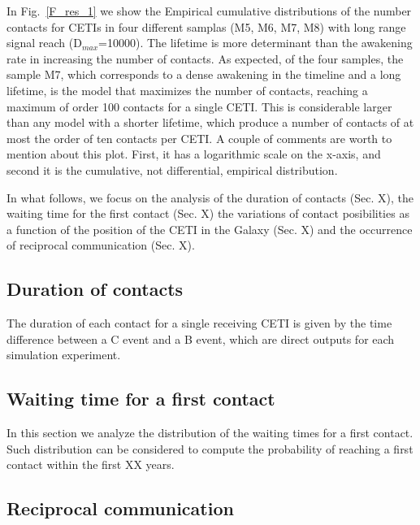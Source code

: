 \documentclass[crop]{CSLB}%
\begin{document}
In Fig.~\ref{F_res_1} we show the Empirical cumulative distributions
of the number contacts for CETIs in four different samplas (M5, M6,
M7, M8) with long range signal reach (D$_{max}$=10000). 
%
The lifetime is more determinant than the awakening rate in increasing
the number of contacts.
%
As expected, of the four samples, the sample M7, which corresponds to
a dense awakening in the timeline and a long lifetime, is the model
that maximizes the number of contacts, reaching a maximum of order 100
contacts for a single CETI.
%
This is considerable larger than any model with a shorter lifetime,
which produce a number of contacts of at most the order of ten
contacts per CETI.
%
A couple of comments are worth to mention about this plot.
%
First, it has a logarithmic scale on the x-axis, and second it is the
cumulative, not differential, empirical distribution.
 



In what follows, we focus on the analysis of the duration of contacts
(Sec. X), the waiting time for the first contact (Sec. X) the
variations of contact posibilities as a function of the position of
the CETI in the Galaxy (Sec. X) and the occurrence of reciprocal
communication (Sec. X).
 





\subsection{Duration of contacts}

The duration of each contact for a single receiving CETI is given by the
time difference between a C event and a B event, which are direct
outputs for each simulation experiment.






\subsection{Waiting time for a first contact}

In this section we analyze the distribution of the waiting times for
a first contact.
%
Such distribution can be considered to compute the probability of
reaching a first contact within the first XX years.




\subsection{Reciprocal communication}
\end{document}
